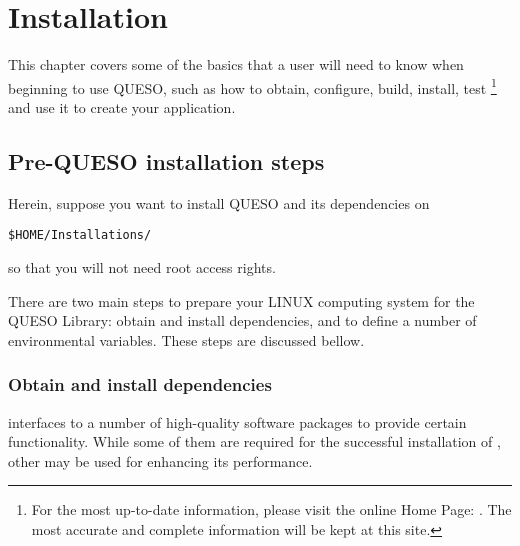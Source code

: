 \chapter{Installation}\label{ch-install}
\thispagestyle{headings}


  
This chapter covers some of the basics that a user will need to know when beginning to use QUESO, such as 
how to obtain, configure, build, install, test \Queso\footnote{For the most up-to-date information,
please visit the online \Queso{} Home Page: \Quesoweb. The most accurate and complete information will be kept at this site.}
and use it to create your application.


        
\section{Pre-QUESO installation steps}\label{sec:Pre_Queso}


Herein, suppose you want to install QUESO and its dependencies on 
\begin{center}
\texttt{\$HOME/Installations/} 
\end{center}
%
so that you will not need root access rights. 

There are two main steps to prepare your LINUX computing system  for  the QUESO Library: obtain and install \Queso{} dependencies, and to define a number of environmental variables. These steps are discussed bellow.


\subsection{Obtain and install \Queso{} dependencies}

\Queso{} interfaces to a number of high-quality software packages to provide certain functionality. While some of them are required for the successful installation of \Queso{}, other may be used for enhancing its performance. 

